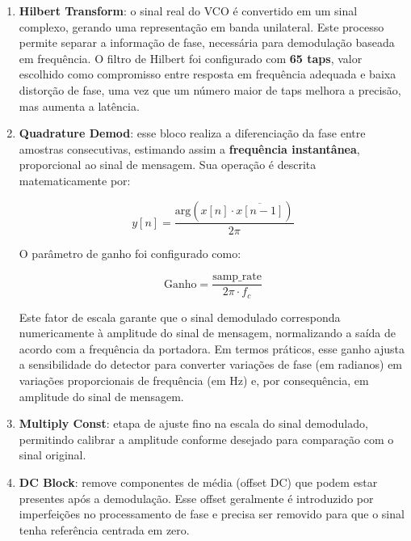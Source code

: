 \begin{enumerate}
    \item \textbf{Hilbert Transform}: o sinal real do VCO é convertido em um sinal complexo, gerando uma representação em banda unilateral. Este processo permite separar a informação de fase, necessária para demodulação baseada em frequência. O filtro de Hilbert foi configurado com \textbf{65 taps}, valor escolhido como compromisso entre resposta em frequência adequada e baixa distorção de fase, uma vez que um número maior de taps melhora a precisão, mas aumenta a latência.

    \item \textbf{Quadrature Demod}: esse bloco realiza a diferenciação da fase entre amostras consecutivas, estimando assim a \textbf{frequência instantânea}, proporcional ao sinal de mensagem. Sua operação é descrita matematicamente por:

    \begin{equation}
    y[n] = \frac{\mathrm{arg}\left( x[n] \cdot \overline{x[n-1]} \right)}{2\pi}
    \end{equation}

    O parâmetro de ganho foi configurado como:

    \begin{equation}
    \mathrm{Ganho} = \frac{\text{samp\_rate}}{2\pi \cdot f_c}
    \end{equation}

    Este fator de escala garante que o sinal demodulado corresponda numericamente à amplitude do sinal de mensagem, normalizando a saída de acordo com a frequência da portadora. Em termos práticos, esse ganho ajusta a sensibilidade do detector para converter variações de fase (em radianos) em variações proporcionais de frequência (em Hz) e, por consequência, em amplitude do sinal de mensagem.

    \item \textbf{Multiply Const}: etapa de ajuste fino na escala do sinal demodulado, permitindo calibrar a amplitude conforme desejado para comparação com o sinal original.

    \item \textbf{DC Block}: remove componentes de média (offset DC) que podem estar presentes após a demodulação. Esse offset geralmente é introduzido por imperfeições no processamento de fase e precisa ser removido para que o sinal tenha referência centrada em zero.


\end{enumerate}
